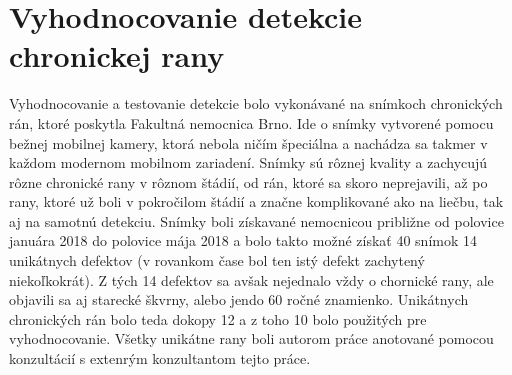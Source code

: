 \section{Vyhodnocovanie detekcie chronickej rany}
Vyhodnocovanie a testovanie detekcie bolo vykonávané na snímkoch chronických rán, ktoré poskytla Fakultná nemocnica Brno. Ide o snímky vytvorené pomocu bežnej mobilnej kamery, ktorá nebola ničím špeciálna a nachádza sa takmer v každom modernom mobilnom zariadení. Snímky sú rôznej kvality a zachycujú rôzne chronické rany v rôznom štádií, od rán, ktoré sa skoro neprejavili, až po rany, ktoré už boli v pokročilom štádií a značne komplikované ako na liečbu, tak aj na samotnú detekciu. Snímky boli získavané nemocnicou približne od polovice januára 2018 do polovice mája 2018 a bolo takto možné získať 40 snímok 14 unikátnych defektov (v rovankom čase bol ten istý defekt zachytený niekoľkokrát). Z tých 14 defektov sa avšak nejednalo vždy o chornické rany, ale objavili sa aj starecké škvrny, alebo jendo 60 ročné znamienko. Unikátnych chronických rán bolo teda dokopy 12 a z toho 10 bolo použitých pre vyhodnocovanie. Všetky unikátne rany boli autorom práce anotované pomocou konzultácií s extenrým konzultantom tejto práce.


